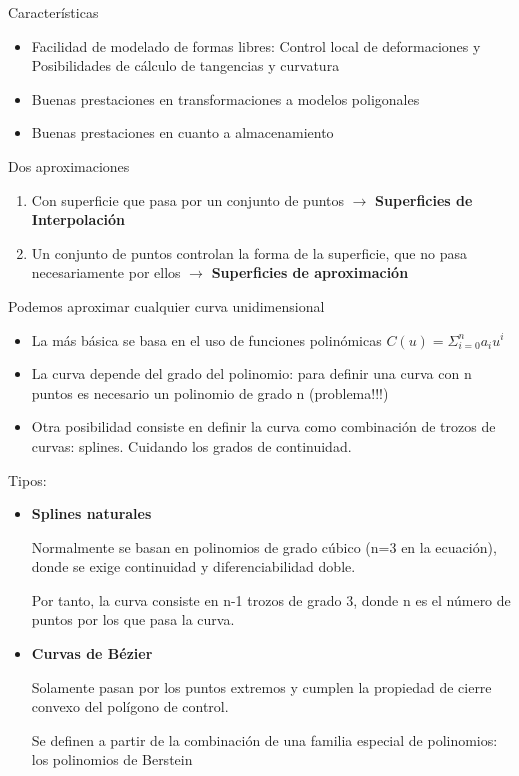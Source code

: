 \begin{itemize}
	      Características
	      \begin{itemize}
		      \item Facilidad de modelado de formas libres: Control local de deformaciones y Posibilidades de cálculo de tangencias y curvatura
		      \item Buenas prestaciones en transformaciones a modelos poligonales
		      \item Buenas prestaciones en cuanto a almacenamiento
	      \end{itemize}
	      Dos aproximaciones
	      \begin{enumerate}
		      \item Con superficie que pasa por un conjunto de puntos $\rightarrow$ \textbf{Superficies de Interpolación}
		      \item Un conjunto de puntos controlan la forma de la superficie, que no pasa necesariamente por ellos $\rightarrow$ \textbf{Superficies de aproximación}
	      \end{enumerate}
	      Podemos aproximar cualquier curva unidimensional
	      \begin{itemize}
		      \item La más básica se basa en el uso de funciones polinómicas $C(u)=\Sigma^n_{i=0} a_iu^i$
		      \item La curva depende del grado del polinomio: para definir una curva con n puntos es necesario un polinomio de grado n (problema!!!)
		      \item Otra posibilidad consiste en definir la curva como combinación de trozos de curvas: splines. Cuidando los grados de continuidad.
	      \end{itemize}
	      Tipos:
	      \begin{itemize}
		      \item \textbf{Splines naturales}

		            Normalmente se basan en polinomios de grado cúbico (n=3 en la ecuación), donde se exige continuidad y diferenciabilidad doble.

		            Por tanto, la curva consiste en n-1 trozos de grado 3, donde n es el número de puntos por los que pasa la curva.
		      \item \textbf{Curvas de Bézier}

		            Solamente pasan por los puntos extremos y cumplen la propiedad de cierre convexo del polígono de control.

		            Se definen a partir de la combinación de una familia especial de polinomios: los polinomios de Berstein


\end{itemize}
\end{itemize}
